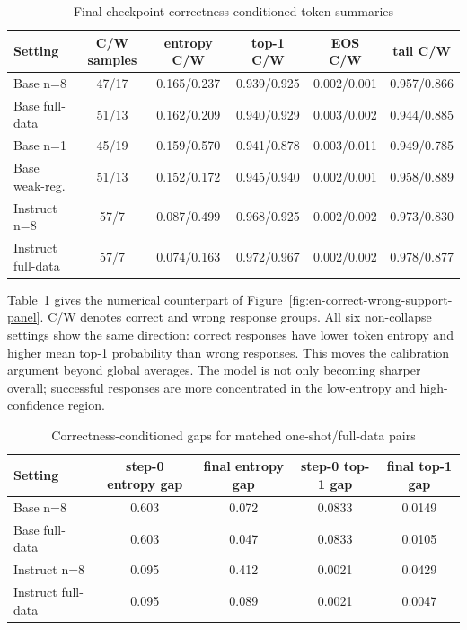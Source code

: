 \documentclass[12pt,a4paper]{ctexart}
\begin{document}
\begin{table}[H]
    \centering
    \caption{Final-checkpoint correctness-conditioned token summaries}
    \label{tab:en-correct-wrong-final-summary}
    \scriptsize
    \setlength{\tabcolsep}{3pt}
    \begin{tabularx}{\textwidth}{>{\raggedright\arraybackslash}p{}ccccc}
        \toprule
        Setting & C/W samples & entropy C/W & top-1 C/W & EOS C/W & tail C/W \\
        \midrule
        Base n=8 & 47/17 & 0.165/0.237 & 0.939/0.925 & 0.002/0.001 & 0.957/0.866 \\
        Base full-data & 51/13 & 0.162/0.209 & 0.940/0.929 & 0.003/0.002 & 0.944/0.885 \\
        Base n=1 & 45/19 & 0.159/0.570 & 0.941/0.878 & 0.003/0.011 & 0.949/0.785 \\
        Base weak-reg. & 51/13 & 0.152/0.172 & 0.945/0.940 & 0.002/0.001 & 0.958/0.889 \\
        Instruct n=8 & 57/7 & 0.087/0.499 & 0.968/0.925 & 0.002/0.002 & 0.973/0.830 \\
        Instruct full-data & 57/7 & 0.074/0.163 & 0.972/0.967 & 0.002/0.002 & 0.978/0.877 \\
        \bottomrule
    \end{tabularx}
\end{table}

Table~\ref{tab:en-correct-wrong-final-summary} gives the numerical counterpart of Figure~\ref{fig:en-correct-wrong-support-panel}. C/W denotes correct and wrong response groups. All six non-collapse settings show the same direction: correct responses have lower token entropy and higher mean top-1 probability than wrong responses. This moves the calibration argument beyond global averages. The model is not only becoming sharper overall; successful responses are more concentrated in the low-entropy and high-confidence region.

\begin{table}[H]
    \centering
    \caption{Correctness-conditioned gaps for matched one-shot/full-data pairs}
    \label{tab:en-correct-wrong-gap-summary}
    \small
    \begin{tabular}{lcccc}
        \toprule
        Setting & step-0 entropy gap & final entropy gap & step-0 top-1 gap & final top-1 gap \\
        \midrule
        Base n=8 & 0.603 & 0.072 & 0.0833 & 0.0149 \\
        Base full-data & 0.603 & 0.047 & 0.0833 & 0.0105 \\
        Instruct n=8 & 0.095 & 0.412 & 0.0021 & 0.0429 \\
        Instruct full-data & 0.095 & 0.089 & 0.0021 & 0.0047 \\
        \bottomrule
    \end{tabular}
\end{table}
\end{document}

